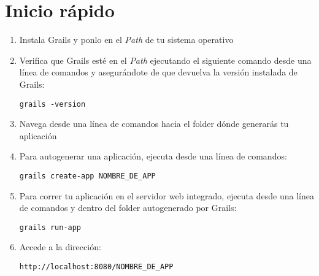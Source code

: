 \chapter{Inicio r\'apido}

\begin{enumerate}
 \item Instala Grails y ponlo en el \textit{Path} de tu sistema operativo
 \item Verifica que Grails est\'e en el \textit{Path} ejecutando el siguiente comando desde una l\'inea de comandos y asegur\'andote de que devuelva la versi\'on instalada de Grails:
        \begin{lstlisting}[gobble=11]
            grails -version
        \end{lstlisting}
 \item Navega desde una l\'inea de comandos hacia el folder d\'onde generar\'as tu aplicaci\'on
 
 \item Para autogenerar una aplicaci\'on, ejecuta desde una l\'inea de comandos:
        \begin{lstlisting}[gobble=11]
            grails create-app NOMBRE_DE_APP
        \end{lstlisting}
        
 \item Para correr tu aplicaci\'on en el servidor web integrado, ejecuta desde una l\'inea de comandos y dentro del folder autogenerado por Grails:
        \begin{lstlisting}[gobble=11]
            grails run-app
        \end{lstlisting}
        
\item Accede a la direcci\'on:
        \begin{lstlisting}[gobble=11]
            http://localhost:8080/NOMBRE_DE_APP
        \end{lstlisting}       

\end{enumerate}


